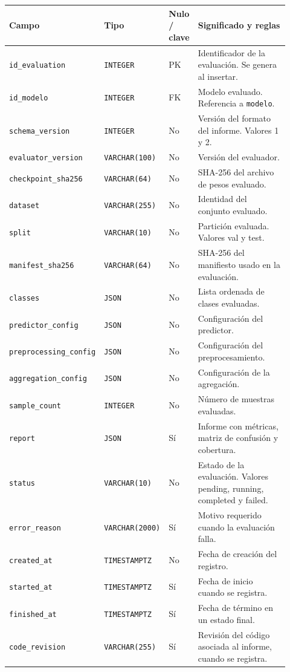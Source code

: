 \noindent
\begin{tabular}{@{}p{0.30\linewidth}p{0.16\linewidth}p{0.10\linewidth}p{0.36\linewidth}@{}}
\hline
\textbf{Campo} & \textbf{Tipo} & \textbf{Nulo / clave} & \textbf{Significado y reglas} \\
\hline
\texttt{id\_\allowbreak{}evaluation} & \texttt{INTEGER} & PK & Identificador de la evaluación. Se genera al insertar. \\
\texttt{id\_\allowbreak{}modelo} & \texttt{INTEGER} & FK & Modelo evaluado. Referencia a \texttt{modelo}. \\
\texttt{schema\_\allowbreak{}version} & \texttt{INTEGER} & No & Versión del formato del informe. Valores 1 y 2. \\
\texttt{evaluator\_\allowbreak{}version} & \texttt{VARCHAR(100)} & No & Versión del evaluador. \\
\texttt{checkpoint\_\allowbreak{}sha256} & \texttt{VARCHAR(64)} & No & SHA-256 del archivo de pesos evaluado. \\
\texttt{dataset} & \texttt{VARCHAR(255)} & No & Identidad del conjunto evaluado. \\
\texttt{split} & \texttt{VARCHAR(10)} & No & Partición evaluada. Valores val y test. \\
\texttt{manifest\_\allowbreak{}sha256} & \texttt{VARCHAR(64)} & No & SHA-256 del manifiesto usado en la evaluación. \\
\texttt{classes} & \texttt{JSON} & No & Lista ordenada de clases evaluadas. \\
\texttt{predictor\_\allowbreak{}config} & \texttt{JSON} & No & Configuración del predictor. \\
\texttt{preprocessing\_\allowbreak{}config} & \texttt{JSON} & No & Configuración del preprocesamiento. \\
\texttt{aggregation\_\allowbreak{}config} & \texttt{JSON} & No & Configuración de la agregación. \\
\texttt{sample\_\allowbreak{}count} & \texttt{INTEGER} & No & Número de muestras evaluadas. \\
\texttt{report} & \texttt{JSON} & Sí & Informe con métricas, matriz de confusión y cobertura. \\
\texttt{status} & \texttt{VARCHAR(10)} & No & Estado de la evaluación. Valores pending, running, completed y failed. \\
\texttt{error\_\allowbreak{}reason} & \texttt{VARCHAR(2000)} & Sí & Motivo requerido cuando la evaluación falla. \\
\texttt{created\_\allowbreak{}at} & \texttt{TIMESTAMPTZ} & No & Fecha de creación del registro. \\
\texttt{started\_\allowbreak{}at} & \texttt{TIMESTAMPTZ} & Sí & Fecha de inicio cuando se registra. \\
\texttt{finished\_\allowbreak{}at} & \texttt{TIMESTAMPTZ} & Sí & Fecha de término en un estado final. \\
\texttt{code\_\allowbreak{}revision} & \texttt{VARCHAR(255)} & Sí & Revisión del código asociada al informe, cuando se registra. \\
\hline
\end{tabular}


